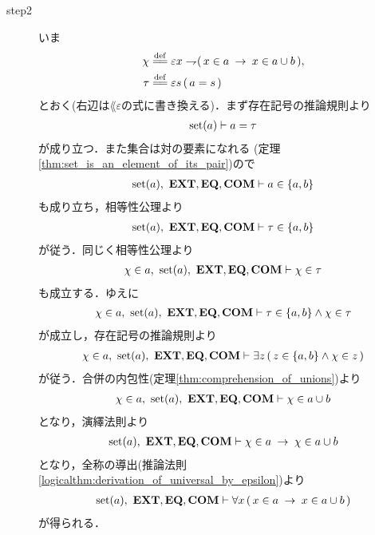 \begin{sketch}
\begin{description}
			\item[step2]
				いま
				\begin{align}
					\chi &\defeq \varepsilon x \negation (\, x \in a \rarrow x \in a \cup b\, ), \\
					\tau &\defeq \varepsilon s\, (\, a = s\, )
				\end{align}
				とおく(右辺は$\lang{\varepsilon}$の式に書き換える)．まず存在記号の推論規則より
				\begin{align}
					\operatorname*{set} (a) \vdash a = \tau
				\end{align}
				が成り立つ．また集合は対の要素になれる
				(定理\ref{thm:set_is_an_element_of_its_pair})ので
				\begin{align}
					\operatorname*{set} (a),\ \mbox{{\bf EXT}},\mbox{{\bf EQ}},\mbox{\bf COM} \vdash a \in \{a,b\}
				\end{align}
				も成り立ち，相等性公理より
				\begin{align}
					\operatorname*{set} (a),\ \mbox{{\bf EXT}},\mbox{{\bf EQ}},\mbox{\bf COM} \vdash \tau \in \{a,b\}
				\end{align}
				が従う．同じく相等性公理より
				\begin{align}
					\chi \in a,\ \operatorname*{set} (a),\ \mbox{{\bf EXT}},\mbox{{\bf EQ}},\mbox{\bf COM} \vdash \chi \in \tau
				\end{align}
				も成立する．ゆえに
				\begin{align}
					\chi \in a,\ \operatorname*{set} (a),\ \mbox{{\bf EXT}},\mbox{{\bf EQ}},\mbox{\bf COM} \vdash 
					\tau \in \{a,b\} \wedge \chi \in \tau
				\end{align}
				が成立し，存在記号の推論規則より
				\begin{align}
					\chi \in a,\ \operatorname*{set} (a),\ \mbox{{\bf EXT}},\mbox{{\bf EQ}},\mbox{\bf COM} \vdash 
					\exists z\, (\, z \in \{a,b\} \wedge \chi \in z\, )
				\end{align}
				が従う．合併の内包性(定理\ref{thm:comprehension_of_unions})より
				\begin{align}
					\chi \in a,\ \operatorname*{set} (a),\ \mbox{{\bf EXT}},\mbox{{\bf EQ}},\mbox{\bf COM} \vdash 
					\chi \in a \cup b
				\end{align}
				となり，演繹法則より
				\begin{align}
					\operatorname*{set} (a),\ \mbox{{\bf EXT}},\mbox{{\bf EQ}},\mbox{\bf COM} \vdash 
					\chi \in a \hspace{0.25em}\rightarrow\hspace{0.25em} \chi \in a \cup b
				\end{align}
				となり，全称の導出(推論法則\ref{logicalthm:derivation_of_universal_by_epsilon})より
				\begin{align}
					\operatorname*{set} (a),\ \mbox{{\bf EXT}},\mbox{{\bf EQ}},\mbox{\bf COM} \vdash 
					\forall x\, (\, x \in a \hspace{0.25em}\rightarrow\hspace{0.25em} x \in a \cup b\, )
				\end{align}
				が得られる．
				\QED
		\end{description}
	\end{sketch}
	

